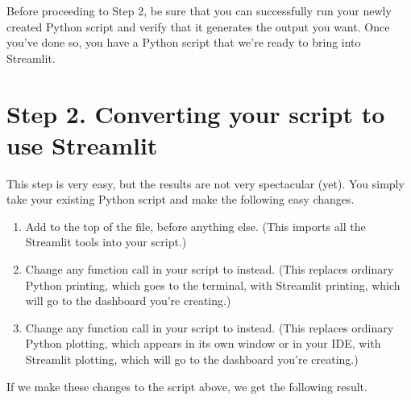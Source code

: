 \documentclass[letterpaper,10pt,english]{sphinxmanual}
\begin{document}
Before proceeding to Step 2, be sure that you can successfully run your newly created Python script and verify that it generates the output you want.  Once you’ve done so, you have a Python script that we’re ready to bring into Streamlit.


\section{Step 2. Converting your script to use Streamlit}
\label{\detokenize{chapter-14-dashboards:step-2-converting-your-script-to-use-streamlit}}
This step is very easy, but the results are not very spectacular (yet).  You simply take your existing Python script and make the following easy changes.
\begin{enumerate}
%
\item {} 
Add  to the top of the file, before anything else.  (This imports all the Streamlit tools into your script.)

\item {} 
Change any  function call in your script to  instead.  (This replaces ordinary Python printing, which goes to the terminal, with Streamlit printing, which will go to the dashboard you’re creating.)

\item {} 
Change any  function call in your script to  instead.  (This replaces ordinary Python plotting, which appears in its own window or in your IDE, with Streamlit plotting, which will go to the dashboard you’re creating.)

\end{enumerate}

If we make these changes to the script above, we get the following result.
\end{document}
